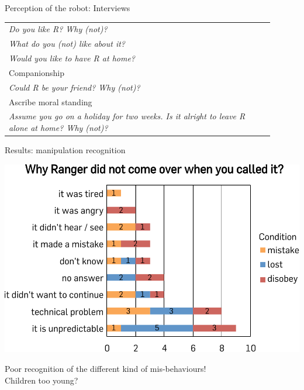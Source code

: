\documentclass[compress]{beamer}
\renewcommand{\bf}{\Medium}
\begin{document}
\begin{frame}{Perception of the robot: Interviews}
\begin{multicols}{2}
\begin{table}[]
\begin{tabularx}{\linewidth}{p{0.9\linewidth}}
    \emph{Do you like R? Why (not)?} \tabularnewline
    \emph{What do you (not) like about it?} \tabularnewline
    \emph{Would you like to have R at home?} \tabularnewline

    \toprule
    {\bf Companionship} \tabularnewline
    \midrule


    \emph{Could R be your friend? Why (not)?}\tabularnewline

    \toprule
    {\bf Ascribe moral standing} \tabularnewline
    \midrule


    \emph{Assume you go on a holiday for two weeks. Is it alright to leave R
    alone at home? Why (not)?} \tabularnewline


            \bottomrule
        \end{tabularx}
        \label{tab:options}
    \end{table}
    \end{multicols}

\end{frame}

\begin{frame}{Results: manipulation recognition}
    
    \begin{center}
    \includegraphics[height=0.6\textheight]{domino-why-misbehavior}

    {\bf Poor recognition of the different kind of mis-behaviours!}\\
    Children too young?
    \end{center}
\end{frame}
\end{document}

